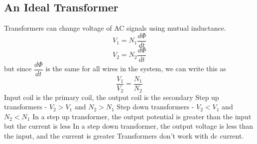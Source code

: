 \documentclass[twocolumn]{article}
\begin{document}
\subsection{An Ideal Transformer}
\begin{outline}
	\1 Transformers can change voltage of AC signals using mutual inductance. 
\0 \[V_1=N_1\dfrac{d\Phi}{dt}\] \[V_2=N_2\dfrac{d\Phi}{dt}\] but since $\dfrac{d\Phi}{dt}$ is the same for all wires in the system, we can write this as \[\dfrac{V_1}{V_2}=\dfrac{N_1}{N_2}\]
	\1 Input coil is the primary coil, the output coil is the secondary
	\1 Step up transformers - \(V_2>V_1\) and \(N_2>N_1\)
	\1 Step down transformers - \(V_2<V_1\) and \(N_2<N_1\)
	\1 In a step up transformer, the output potential is greater than the input but the current is less 
	\1 In a step down transformer, the output voltage is less than the input, and the current is greater 
	\1 Transformers don't work with dc current. 
\end{outline}
\end{document}
